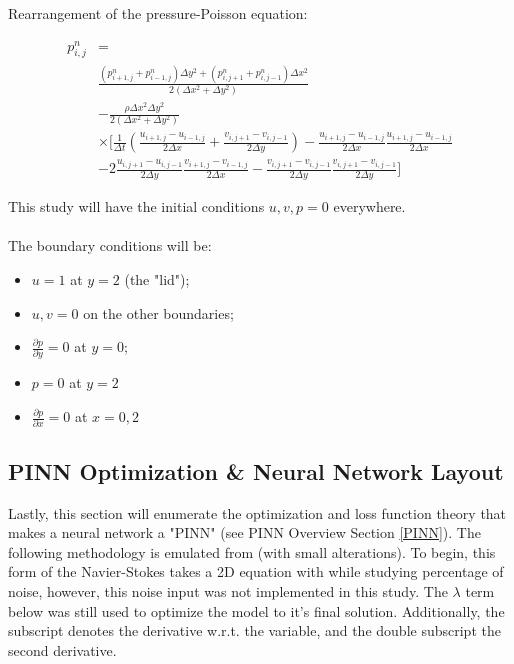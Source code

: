 \documentclass{article}
\begin{document}
    
    \noindent  Rearrangement of the pressure-Poisson equation:

    \begin{equation}
    \begin{aligned}
    p_{i,j}^{n} & =  \\
    & \frac{\left(p_{i+1,j}^{n}+p_{i-1,j}^{n}\right) \Delta y^2 + \left(p_{i,j+1}^{n}+p_{i,j-1}^{n}\right) \Delta x^2}{2\left(\Delta x^2+\Delta y^2\right)} \\
    & -\frac{\rho\Delta x^2\Delta y^2}{2\left(\Delta x^2+\Delta y^2\right)} \\
    & \times \biggr[\frac{1}{\Delta t}\left(\frac{u_{i+1,j}-u_{i-1,j}}{2\Delta x}+\frac{v_{i,j+1}-v_{i,j-1}}{2\Delta y}\right)  -\frac{u_{i+1,j}-u_{i-1,j}}{2\Delta x}\frac{u_{i+1,j}-u_{i-1,j}}{2\Delta x} \\ 
    & - 2\frac{u_{i,j+1}-u_{i,j-1}}{2\Delta y}\frac{v_{i+1,j}-v_{i-1,j}}{2\Delta x}- \frac{v_{i,j+1}-v_{i,j-1}}{2\Delta y}\frac{v_{i,j+1}-v_{i,j-1}}{2\Delta y}\biggr]
    \end{aligned}
    \end{equation}
    \linebreak
    \linebreak
    
    \begin{boxA}
		This study will have the initial conditions $u, v, p = 0$ everywhere. \\ 
		\\
		The boundary conditions will be: 
		\begin{itemize}
    		\item $u=1$ at $y=2$ (the "lid");
    		\item $u, v=0$ on the other boundaries;
    		\item $\frac{\partial p}{\partial y}=0$ at $y=0$;
    		\item $p=0$ at $y=2$
    		\item $\frac{\partial p}{\partial x}=0$ at $x=0,2$
	    \end{itemize}
    \end{boxA}

	\subsection{PINN Optimization \& Neural Network Layout}
    \noindent Lastly, this section will enumerate the optimization and loss function theory that makes a neural network a "PINN" (see PINN Overview Section \ref{PINN}). The following methodology is emulated from \citeauthor{DBLP:journals/corr/abs-1711-10566}\cite{DBLP:journals/corr/abs-1711-10566}(with small alterations). To begin, this form of the Navier-Stokes takes a 2D equation  with while studying percentage of noise, however, this noise input was not implemented in this study. The $\lambda$ term below was still used to optimize the model to
    it's final solution. Additionally, the subscript denotes the derivative w.r.t. the variable, and the double subscript the second derivative.\\
    
\end{document}
